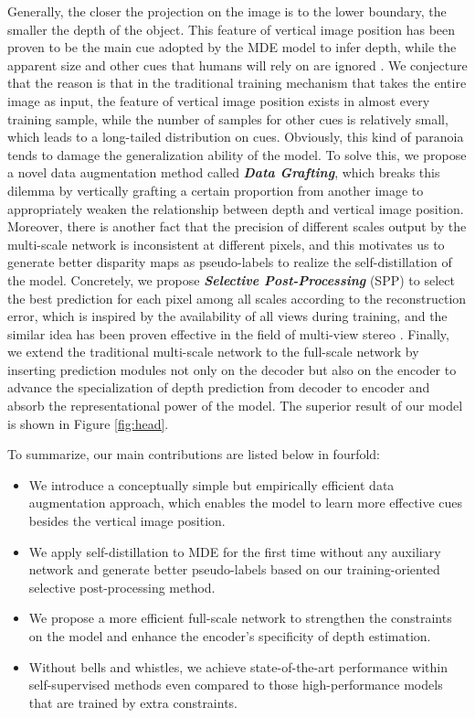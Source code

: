 \documentclass[10pt,twocolumn,letterpaper]{article}
\begin{document}
Generally, the closer the projection on the image is to the lower boundary, the 
smaller the depth of the object. This feature of vertical image position has been proven 
to be the main cue adopted by the MDE model to infer depth, while the apparent size 
and other cues that humans will rely on are ignored \cite{VanDijk2019}. 
We conjecture that the reason is that in the traditional training mechanism that 
takes the entire image as input, the feature of vertical image position exists in 
almost every training sample, while the number of samples for other cues is 
relatively small, which leads to a long-tailed distribution on cues. Obviously, 
this kind of paranoia tends to damage the generalization ability of the model. 
To solve this, we propose a novel data augmentation method called 
{\bf \em Data Grafting}, which breaks this dilemma by vertically grafting a certain 
proportion from another image to appropriately weaken the relationship between 
depth and vertical image position. 
Moreover, there is another fact that the precision of different scales 
output by the multi-scale network is inconsistent at different pixels, and this motivates 
us to generate better disparity maps as pseudo-labels to realize the self-distillation 
of the model. Concretely, we propose {\bf \em Selective 
Post-Processing} (SPP) to select the best prediction for each pixel among all scales 
according to the reconstruction error, which is inspired by the availability of all 
views during training, and the similar idea has been proven effective in the field of 
multi-view stereo \cite{yi2020pyramid}. Finally, we extend the traditional 
multi-scale network to the full-scale network by inserting prediction modules not only 
on the decoder but also on the encoder to advance the specialization of depth 
prediction from decoder to encoder and absorb the representational power of the model. 
The superior result of our model is shown in Figure 
\ref{fig:head}.

To summarize, our main contributions are listed below in fourfold:

\begin{itemize}[leftmargin=*]
\item We introduce a conceptually simple but empirically efficient data 
augmentation approach, which enables the model to learn more effective cues 
besides the vertical image position.
\item We apply self-distillation to MDE for the first time without any auxiliary network 
and generate better pseudo-labels based on our training-oriented selective 
post-processing method.
\item We propose a more efficient full-scale network to strengthen the constraints 
on the model and enhance the encoder's specificity of depth estimation.
\item Without bells and whistles, we achieve state-of-the-art 
performance within self-supervised methods even compared to those 
high-performance models that are trained by extra constraints.
\end{itemize}
\end{document}
